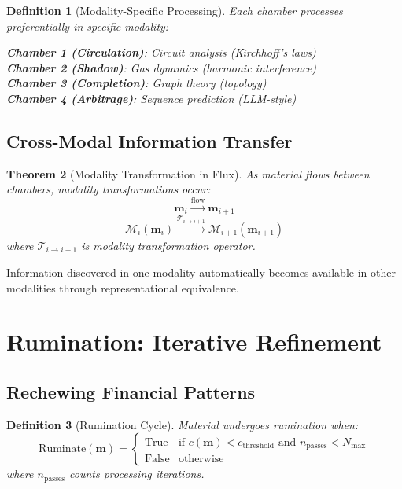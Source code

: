\documentclass[12pt]{article}
\newtheorem{theorem}{Theorem}
\newtheorem{definition}[theorem]{Definition}
\begin{document}
\begin{definition}[Modality-Specific Processing]
Each chamber processes preferentially in specific modality:

\textbf{Chamber 1 (Circulation)}: Circuit analysis (Kirchhoff's laws)\\
\textbf{Chamber 2 (Shadow)}: Gas dynamics (harmonic interference)\\
\textbf{Chamber 3 (Completion)}: Graph theory (topology)\\
\textbf{Chamber 4 (Arbitrage)}: Sequence prediction (LLM-style)
\end{definition}

\subsection{Cross-Modal Information Transfer}

\begin{theorem}[Modality Transformation in Flux]
As material flows between chambers, modality transformations occur:
$$
\mathbf{m}_i \xrightarrow{\text{flow}} \mathbf{m}_{i+1}
$$
$$
\mathcal{M}_i(\mathbf{m}_i) \xrightarrow{\mathcal{T}_{i \to i+1}} \mathcal{M}_{i+1}(\mathbf{m}_{i+1})
$$
where $\mathcal{T}_{i \to i+1}$ is modality transformation operator.
\end{theorem}

Information discovered in one modality automatically becomes available in other modalities through representational equivalence.

\section{Rumination: Iterative Refinement}

\subsection{Rechewing Financial Patterns}

\begin{definition}[Rumination Cycle]
Material undergoes rumination when:
$$
\text{Ruminate}(\mathbf{m}) = \begin{cases}
\text{True} & \text{if } c(\mathbf{m}) < c_{\text{threshold}} \text{ and } n_{\text{passes}} < N_{\text{max}} \\
\text{False} & \text{otherwise}
\end{cases}
$$
where $n_{\text{passes}}$ counts processing iterations.
\end{definition}
\end{document}
